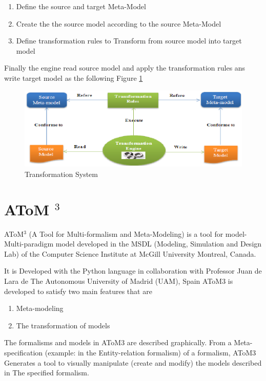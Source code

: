 \begin{enumerate}
\item Define the  source and target Meta-Model 
\item Create the the source model according to the source Meta-Model 
\item Define transformation rules to Transform from source model into target model 
\end{enumerate}
Finally the engine read source model and apply the transformation rules ans write target model
as the following Figure \ref{fig:Transformation System}
 

\begin{figure}[th]
	\centering
		\includegraphics{chapiter3/img/sys}
	\caption{\label{fig:Transformation System}Transformation System}
\end{figure} 
 
\pagebreak

\section{AToM $^{3}$}

AToM$^{3}$ (A Tool for Multi-formalism and Meta-Modeling) is a tool for model-
Multi-paradigm model developed in the MSDL (Modeling, Simulation and
Design Lab) of the Computer Science Institute at McGill University Montreal, Canada.

It is Developed with the Python language in collaboration with Professor Juan de Lara de
The Autonomous University of Madrid (UAM), Spain  
AToM3 is developed to satisfy two main features that are 
\begin{enumerate}
\item Meta-modeling 
\item The transformation of models
\end{enumerate}

The formalisms and models in AToM3 are described graphically. 
From a Meta-specification (example: in the Entity-relation formalism) of a formalism, AToM3
Generates a tool to visually manipulate (create and modify) the models described in
The specified formalism.

